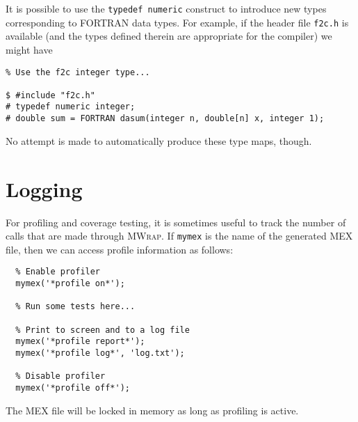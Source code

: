 \documentclass[12pt]{article}
\newcommand{\mwrap}{\textsc{MWrap}}
\begin{document}
It is possible to use the {\tt typedef numeric} construct to introduce
new types corresponding to FORTRAN data types.  For example, if the
header file {\tt f2c.h} is available (and the types defined therein are
appropriate for the compiler) we might have
\begin{verbatim}
% Use the f2c integer type...

$ #include "f2c.h"
# typedef numeric integer;
# double sum = FORTRAN dasum(integer n, double[n] x, integer 1);
\end{verbatim}
No attempt is made to automatically produce these type maps, though.


\section{Logging}

For profiling and coverage testing, it is sometimes useful to track the
number of calls that are made through \mwrap.  If {\tt mymex} is the name
of the generated MEX file, then we can access profile information as
follows:
\begin{verbatim}
  % Enable profiler
  mymex('*profile on*');

  % Run some tests here...

  % Print to screen and to a log file
  mymex('*profile report*');
  mymex('*profile log*', 'log.txt');

  % Disable profiler
  mymex('*profile off*');
\end{verbatim}

The MEX file will be locked in memory as long as profiling is active.
\end{document}
